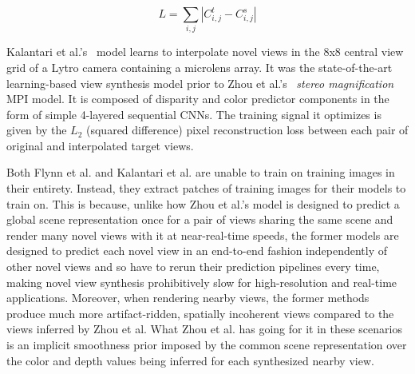\[ L = \sum_{i,j} |C_{i,j}^t - C_{i,j}^s| \]

Kalantari et al.'s~\cite{kalantari_2016} model learns to interpolate novel views in the 8x8 central view grid of a Lytro camera containing a microlens array. It was the state-of-the-art learning-based view synthesis model prior to Zhou et al.'s~\cite{zhou2018stereo} \textit{stereo magnification} MPI model. It is composed of disparity and color predictor components in the form of simple 4-layered sequential CNNs. The training signal it optimizes is given by the $L_2$ (squared difference) pixel reconstruction loss between each pair of original and interpolated target views.

Both Flynn et al. and Kalantari et al. are unable to train on training images in their entirety. Instead, they extract patches of training images for their models to train on. This is because, unlike how Zhou et al.'s model is designed to predict a global scene representation once for a pair of views sharing the same scene and render many novel views with it at near-real-time speeds, the former models are designed to predict each novel view in an end-to-end fashion independently of other novel views and so have to rerun their prediction pipelines every time, making novel view synthesis prohibitively slow for high-resolution and real-time applications. Moreover, when rendering nearby views, the former methods produce much more artifact-ridden, spatially incoherent views compared to the views inferred by Zhou et al. What Zhou et al. has going for it in these scenarios is an implicit smoothness prior imposed by the common scene representation over the color and depth values being inferred for each synthesized nearby view. 

